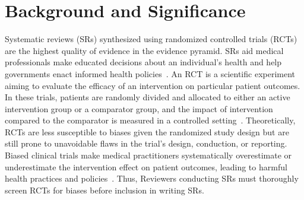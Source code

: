 \documentclass[sn-mathphys,Numbered]{sn-jnl}%
\theoremstyle{thmstyleone}%
\theoremstyle{thmstyletwo}%
\theoremstyle{thmstylethree}%
\begin{document}



\maketitle


\section{Background and Significance}
\label{sec:background}
%
Systematic reviews (SRs) synthesized using randomized controlled trials (RCTs) are the highest quality of evidence in the evidence pyramid.
SRs aid medical professionals make educated decisions about an individual's health and help governments enact informed health policies~\cite{mogo2022systematic,mctigue2006obesity}.
An RCT is a scientific experiment aiming to evaluate the efficacy of an intervention on particular patient outcomes.
In these trials, patients are randomly divided and allocated to either an active intervention group or a comparator group, and the impact of intervention compared to the comparator is measured in a controlled setting~\cite{sibbald1998understanding}.
Theoretically, RCTs are less susceptible to biases given the randomized study design but are still prone to unavoidable flaws in the trial's design, conduction, or reporting.
Biased clinical trials make medical practitioners systematically overestimate or underestimate the intervention effect on patient outcomes, leading to harmful health practices and policies~\cite{kjaergard1999randomized,naci2019design}.
Thus, Reviewers conducting SRs must thoroughly screen RCTs for biases before inclusion in writing SRs.
\end{document}

